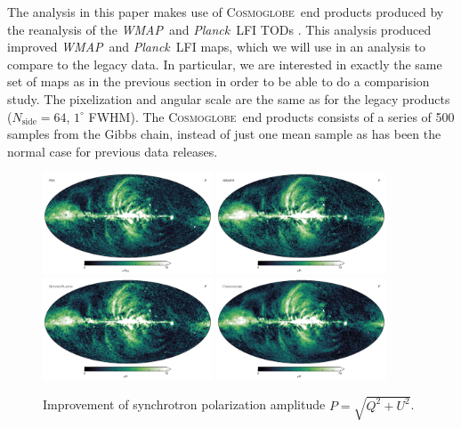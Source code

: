 \documentclass[twocolumn]{../../common/aa}
\def\WMAP{\emph{WMAP}}
\def\Planck{\emph{Planck}}
\newcommand{\cosmoglobe}{\textsc{Cosmoglobe}}
\begin{document}
The analysis in this paper makes use of \cosmoglobe\ end products produced by the reanalysis of the \WMAP\ and \Planck\ LFI TODs \citep{watts2023_dr1}. This analysis produced improved \WMAP\ and \Planck\ LFI maps, which we will use in an analysis to compare to the legacy data. In particular, we are interested in exactly the same set of maps as in the previous section in order to be able to do a comparision study. The pixelization and angular scale are the same as for the legacy products ($N_\textrm{side}=64$, $1^\circ$ FWHM). The \cosmoglobe\ end products consists of a series of 500 samples from the Gibbs chain, instead of just one mean sample as has been the normal case for previous data releases.

\begin{figure}
	\centering
	\includegraphics[width=0.45\textwidth]{figures/polint_PR4.pdf}
	\includegraphics[width=0.45\textwidth]{figures/polint_WMAP9.pdf}
	\includegraphics[width=0.45\textwidth]{figures/polint_BP.pdf}
	\includegraphics[width=0.45\textwidth]{figures/polint_CG.pdf}
	\caption{
		Improvement of synchrotron polarization amplitude $P=\sqrt{Q^2+U^2}$.
		}
       \label{fig:synch_polint}
\end{figure}
\end{document}
